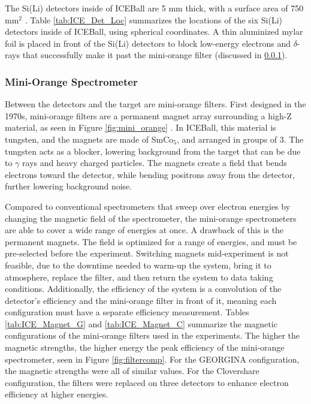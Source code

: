 The Si(Li) detectors inside of ICEBall are 5 mm thick, with a surface area of 750 mm$^2$ \citep{metlay93:_iceball_comm}. Table \ref{tab:ICE_Det_Loc} summarizes the locations of the six Si(Li) detectors inside of ICEBall, using spherical coordinates. A thin aluminized mylar foil is placed in front of the Si(Li) detectors to block low-energy electrons and $\delta$-rays that successfully make it past the mini-orange filter (discussed in \ref{sec:mini_orange}).



\subsubsection{Mini-Orange Spectrometer}
\label{sec:mini_orange}

Between the detectors and the target are mini-orange filters. First designed in the 1970s, mini-orange filters are a permanent magnet array surrounding a high-Z material, as seen in Figure \ref{fig:mini_orange} \citep{vanklinken72:mini_orange, vanklinken75:mini_orange}. In ICEBall, this material is tungsten, and the magnets are made of SmCo$_5$, and arranged in groups of 3. The tungsten acts as a blocker, lowering background from the target that can be due to $\gamma$ rays and heavy charged particles. The magnets create a field that bends electrons toward the detector, while bending positrons away from the detector, further lowering background noise. 



Compared to conventional spectrometers that sweep over electron energies by changing the magnetic field of the spectrometer, the mini-orange spectrometers are able to cover a wide range of energies at once. A drawback of this is the permanent magnets. The field is optimized for a range of energies, and must be pre-selected before the experiment. Switching magnets mid-experiment is not feasible, due to the downtime needed to warm-up the system, bring it to atmosphere, replace the filter, and then return the system to data taking conditions. Additionally, the efficiency of the system is a convolution of the detector's efficiency and the mini-orange filter in front of it, meaning each configuration must have a separate efficiency measurement. Tables \ref{tab:ICE_Magnet_G} and \ref{tab:ICE_Magnet_C} summarize the magnetic configurations of the mini-orange filters used in the experiments. The higher the magnetic strengths, the higher energy the peak efficiency of the mini-orange spectrometer, seen in Figure \ref{fig:filtercomp}. For the GEORGINA configuration, the magnetic strengths were all of similar values. For the Clovershare configuration, the filters were replaced on three detectors to enhance electron efficiency at higher energies.

